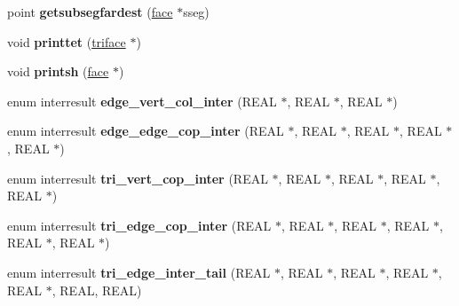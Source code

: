 \begin{DoxyCompactItemize}
point {\bfseries getsubsegfardest} (\hyperlink{classStemMesh3D_1_1tetgenmesh_1_1face}{face} $\ast$sseg)
\item 
\mbox{\label{classStemMesh3D_1_1tetgenmesh_a40d979ac7a0baf2498a4f08fcd0146b4}} 
void {\bfseries printtet} (\hyperlink{classStemMesh3D_1_1tetgenmesh_1_1triface}{triface} $\ast$)
\item 
\mbox{\label{classStemMesh3D_1_1tetgenmesh_a54f45db1bff9bab3d9d9019be9e71cda}} 
void {\bfseries printsh} (\hyperlink{classStemMesh3D_1_1tetgenmesh_1_1face}{face} $\ast$)
\item 
\mbox{\label{classStemMesh3D_1_1tetgenmesh_a415ace0ebab5cc1d067c9b5767538f47}} 
enum interresult {\bfseries edge\+\_\+vert\+\_\+col\+\_\+inter} (R\+E\+AL $\ast$, R\+E\+AL $\ast$, R\+E\+AL $\ast$)
\item 
\mbox{\label{classStemMesh3D_1_1tetgenmesh_a9ff83b618701f712c1da13139d39793a}} 
enum interresult {\bfseries edge\+\_\+edge\+\_\+cop\+\_\+inter} (R\+E\+AL $\ast$, R\+E\+AL $\ast$, R\+E\+AL $\ast$, R\+E\+AL $\ast$, R\+E\+AL $\ast$)
\item 
\mbox{\label{classStemMesh3D_1_1tetgenmesh_afe58522296f004fd77986a8b251a4870}} 
enum interresult {\bfseries tri\+\_\+vert\+\_\+cop\+\_\+inter} (R\+E\+AL $\ast$, R\+E\+AL $\ast$, R\+E\+AL $\ast$, R\+E\+AL $\ast$, R\+E\+AL $\ast$)
\item 
\mbox{\label{classStemMesh3D_1_1tetgenmesh_a397c58c0588b4898c7fe53e37cfb78f2}} 
enum interresult {\bfseries tri\+\_\+edge\+\_\+cop\+\_\+inter} (R\+E\+AL $\ast$, R\+E\+AL $\ast$, R\+E\+AL $\ast$, R\+E\+AL $\ast$, R\+E\+AL $\ast$, R\+E\+AL $\ast$)
\item 
\mbox{\label{classStemMesh3D_1_1tetgenmesh_a522c62d95f5583800e4984f7f5d3f534}} 
enum interresult {\bfseries tri\+\_\+edge\+\_\+inter\+\_\+tail} (R\+E\+AL $\ast$, R\+E\+AL $\ast$, R\+E\+AL $\ast$, R\+E\+AL $\ast$, R\+E\+AL $\ast$, R\+E\+AL, R\+E\+AL)
\item 
\mbox{\label{classStemMesh3D_1_1tetgenmesh_aa447b39058638502be1d5d9a160a02c7}} 

\end{DoxyCompactItemize}
